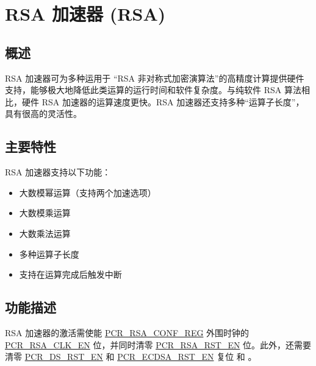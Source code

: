 \documentclass[main\_\_CN.tex]{subfiles}
\begin{document}

\ifglobal
\else
    {\let\clearpage\relax \listoftodos}
    {\let\clearpage\relax \listofdonetodos}
    \tableofcontents
\fi


\hypertarget{rsa}{}
\chapter{RSA 加速器 (RSA)}\label{mod:rsa}

\section{概述}

RSA 加速器可为多种运用于 “RSA 非对称式加密演算法”的高精度计算提供硬件支持，能够极大地降低此类运算的运行时间和软件复杂度。与纯软件 RSA 算法相比，硬件 RSA 加速器的运算速度更快。RSA 加速器还支持多种“运算子长度”，具有很高的灵活性。

\section{主要特性}

RSA 加速器支持以下功能：
\begin{itemize}
    \item 大数模幂运算（支持两个加速选项）
    \item 大数模乘运算
    \item 大数乘法运算
    \item 多种运算子长度
    \item 支持在运算完成后触发中断
\end{itemize}


\section{功能描述}\label{sec:rsa-func-desc}

RSA 加速器的激活需使能 \hyperref[regdesc:PCRRSACONFREG]{PCR\_RSA\_CONF\_REG} 外围时钟的 \hyperref[fielddesc:PCRRSACLKEN]{PCR\_RSA\_CLK\_EN} 位，并同时清零 \hyperref[fielddesc:PCRRSARSTEN]{PCR\_RSA\_RST\_EN} 位。此外，还需要清零 \hyperref[fielddesc:PCRDSRSTEN]{PCR\_DS\_RST\_EN} 和 \hyperref[fielddesc:PCRECDSARSTEN]{PCR\_ECDSA\_RST\_EN} 复位  和 。
\end{document}
